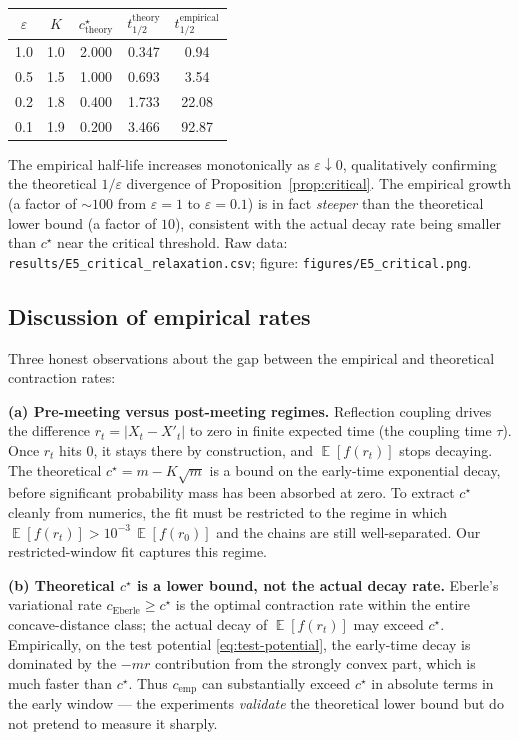 \documentclass[11pt]{article}
\theoremstyle{definition}
\DeclareMathOperator{\E}{\mathbb{E}}
\newcommand{\abs}[1]{\left\lvert #1 \right\rvert}
\begin{document}
\begin{center}
\begin{tabular}{ccccc}
\hline
$\varepsilon$ & $K$ & $c^\star_{\text{theory}}$ & $t_{1/2}^{\text{theory}}$ & $t_{1/2}^{\text{empirical}}$ \\
\hline
1.0 & 1.0 & 2.000 & 0.347 & 0.94  \\
0.5 & 1.5 & 1.000 & 0.693 & 3.54  \\
0.2 & 1.8 & 0.400 & 1.733 & 22.08 \\
0.1 & 1.9 & 0.200 & 3.466 & 92.87 \\
\hline
\end{tabular}
\end{center}

The empirical half-life increases monotonically as $\varepsilon \downarrow 0$, qualitatively confirming the theoretical $1/\varepsilon$ divergence of Proposition~\ref{prop:critical}. The empirical growth (a factor of $\sim 100$ from $\varepsilon = 1$ to $\varepsilon = 0.1$) is in fact \emph{steeper} than the theoretical lower bound (a factor of $10$), consistent with the actual decay rate being smaller than $c^\star$ near the critical threshold. Raw data: \texttt{results/E5\_critical\_relaxation.csv}; figure: \texttt{figures/E5\_critical.png}.

\subsection{Discussion of empirical rates}
Three honest observations about the gap between the empirical and theoretical contraction rates:

\textbf{(a) Pre-meeting versus post-meeting regimes.} Reflection coupling drives the difference $r_t = \abs{X_t - X'_t}$ to zero in finite expected time (the coupling time $\tau$). Once $r_t$ hits $0$, it stays there by construction, and $\E[f(r_t)]$ stops decaying. The theoretical $c^\star = m - K\sqrt m$ is a bound on the early-time exponential decay, before significant probability mass has been absorbed at zero. To extract $c^\star$ cleanly from numerics, the fit must be restricted to the regime in which $\E[f(r_t)] > 10^{-3}\,\E[f(r_0)]$ and the chains are still well-separated. Our restricted-window fit captures this regime.

\textbf{(b) Theoretical $c^\star$ is a lower bound, not the actual decay rate.} Eberle's variational rate $c_{\mathrm{Eberle}} \ge c^\star$ is the optimal contraction rate within the entire concave-distance class; the actual decay of $\E[f(r_t)]$ may exceed $c^\star$. Empirically, on the test potential \eqref{eq:test-potential}, the early-time decay is dominated by the $-m r$ contribution from the strongly convex part, which is much faster than $c^\star$. Thus $c_{\mathrm{emp}}$ can substantially exceed $c^\star$ in absolute terms in the early window — the experiments \emph{validate} the theoretical lower bound but do not pretend to measure it sharply.
\end{document}
